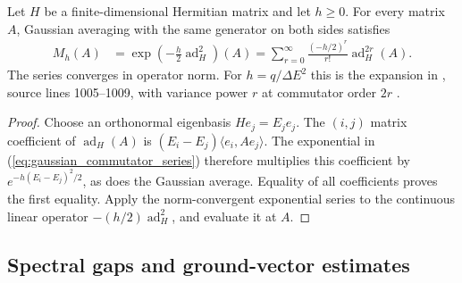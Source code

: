 \begin{theorem}
    \label{thm:gaussian_commutator_series}
    \leanok
    Let $H$ be a finite-dimensional Hermitian matrix and let $h\ge0$.
    For every matrix $A$, Gaussian averaging with the same generator on
    both sides satisfies
    \begin{align}
        M_h(A)
        &=\exp\!\left(-\frac h2\operatorname{ad}_H^2\right)(A)
          =\sum_{r=0}^{\infty}\frac{(-h/2)^r}{r!}
            \operatorname{ad}_H^{2r}(A).
        \label{eq:gaussian_commutator_series}
    \end{align}
    The series converges in operator norm. For $h=q/\Delta E^2$ this is
    the expansion in \cite{Hastings2006Solving}, source lines 1005--1009,
    with variance power $r$ at commutator order $2r$
    \cite{gap:hastings05_gaussian_series_coefficients}.
\end{theorem}
\begin{proof}\leanok
    Choose an orthonormal eigenbasis $He_j=E_je_j$.
    The $(i,j)$ matrix coefficient of $\operatorname{ad}_H(A)$ is
    $(E_i-E_j)\langle e_i,Ae_j\rangle$. The exponential in
    (\ref{eq:gaussian_commutator_series}) therefore multiplies this
    coefficient by $e^{-h(E_i-E_j)^2/2}$, as does the Gaussian average.
    Equality of all coefficients proves the first equality. Apply the
    norm-convergent exponential series to the continuous linear operator
    $-(h/2)\operatorname{ad}_H^2$, and evaluate it at $A$.
\end{proof}

\subsection{Spectral gaps and ground-vector estimates}

